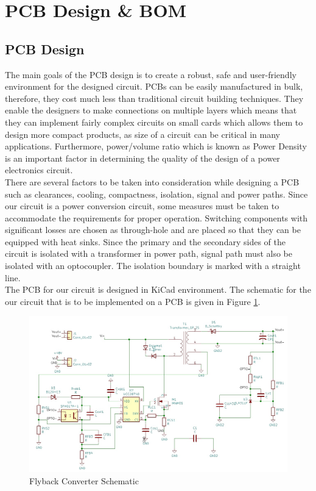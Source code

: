 \section{PCB Design \& BOM}
\subsection{PCB Design}
The main goals of the PCB design is to create a robust, safe and user-friendly environment for the designed circuit. PCBs can be easily manufactured in bulk, therefore, they cost much less than traditional circuit building techniques. They enable the designers to make connections on multiple layers which means that they can implement fairly complex circuits on small cards which allows them to design more compact products, as size of a circuit can be critical in many applications. Furthermore, power/volume ratio which is known as Power Density is an important factor in determining the quality of the design of a power electronics circuit. 
\\There are several factors to be taken into consideration while designing a PCB such as clearances, cooling, compactness, isolation, signal and power paths. Since our circuit is a power conversion circuit, some measures must be taken to accommodate the requirements for proper operation. Switching components with significant losses are chosen as through-hole and are placed so that they can be equipped with heat sinks. Since the primary and the secondary sides of the circuit is isolated with a transformer in power path, signal path must also be isolated with an optocoupler. The isolation boundary is marked with a straight line.
\\ The PCB for our circuit is designed in KiCad environment. The schematic for the our circuit that is to be implemented on a PCB is given in Figure \ref{fig:layout}.
\begin{figure}[H]
\begin{center}
\includegraphics[width=1\textwidth]{figures/layout.jpg}
\caption{Flyback Converter Schematic}
\label{fig:layout}
\end{center}
\end{figure}
